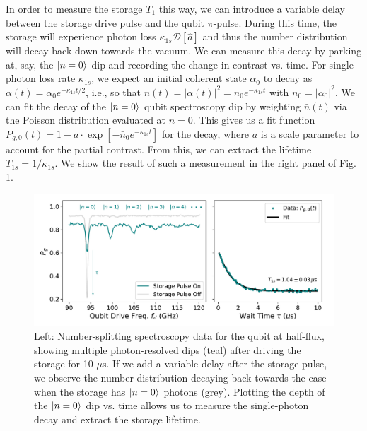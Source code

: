 In order to measure the storage $T_1$ this way, we can introduce a variable delay between the storage drive pulse and the qubit $\pi$-pulse. During this time, the storage will experience photon loss $\kappa_{1s}\mathcal{D}[\hat{a}]$ and thus the number distribution will decay back down towards the vacuum. We can measure this decay by parking at, say, the $\lvert n=0\rangle$ dip and recording the change in contrast vs. time. For single-photon loss rate $\kappa_{1s}$, we expect an initial coherent state $\alpha_0$ to decay as $\alpha(t) = \alpha_0 e^{-\kappa_{1s}t/2}$, i.e., so that $\bar{n}(t) = |\alpha(t)|^2 =  \bar{n}_0 e^{-\kappa_{1s}t}$ with $\bar{n}_0 = |\alpha_0|^2$. We can fit the decay of the $\lvert n=0\rangle$ qubit spectroscopy dip by weighting $\bar{n}(t)$ via the Poisson distribution evaluated at $n = 0$. This gives us a fit function $P_{g, 0}(t) = 1-a\cdot\exp[-\bar{n}_0 e^{-\kappa_{1s}t}]$ for the decay, where $a$ is a scale parameter to account for the partial contrast. From this, we can extract the lifetime $T_{1s} = 1/\kappa_{1s}$. We show the result of such a measurement in the right panel of Fig. \ref{fig:4_storage_T1_numsplit}.
\begin{figure}[h]
    \centering
    \includegraphics[width=\linewidth]{Figures/4/storage_T1_numsplit.pdf}
    \caption[Qubit spectroscopy in the photon-number resolved regime and time-domain measurement of the storage resonator \texorpdfstring{$T_1$}{T1} lifetime.]{Left: Number-splitting spectroscopy data for the qubit at half-flux, showing multiple photon-resolved dips (teal) after driving the storage for 10 $\mu$s. If we add a variable delay after the storage pulse, we observe the number distribution decaying back towards the case when the storage has $\lvert n=0\rangle$ photons (grey). Plotting the depth of the $\lvert n=0\rangle$ dip vs. time allows us to measure the single-photon decay and extract the storage lifetime.}
    \label{fig:4_storage_T1_numsplit}
\end{figure}

